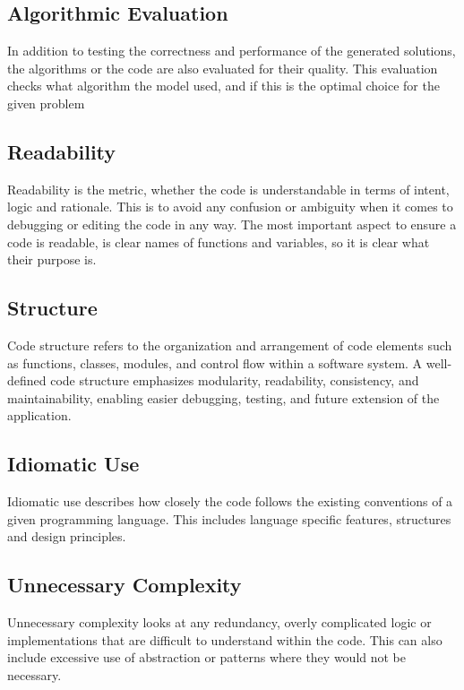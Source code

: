 \documentclass[12pt,a4paper]{report}
\begin{document}
\subsection{Algorithmic Evaluation}
In addition to testing the correctness and performance of the generated solutions, the algorithms or the code are also evaluated for their quality. This evaluation checks what algorithm the model used, and if this is the optimal choice for the given problem 

\subsection{Readability}
Readability is the metric, whether the code is understandable in terms of intent, logic and rationale. This is to avoid any confusion or ambiguity when it comes to debugging or editing the code in any way. The most important aspect to ensure a code is readable, is clear names of functions and variables, so it is clear what their purpose is.

\subsection{Structure}
Code structure refers to the organization and arrangement of code elements such as functions, classes, modules, and control flow within a software system. A well-defined code structure emphasizes modularity, readability, consistency, and maintainability, enabling easier debugging, testing, and future extension of the application.

\subsection{Idiomatic Use}
Idiomatic use describes how closely the code follows the existing conventions of a given programming language. This includes language specific features, structures and design principles.

\subsection{Unnecessary Complexity}
Unnecessary complexity looks at any redundancy, overly complicated logic or implementations that are difficult to understand within the code. This can also include excessive use of abstraction or patterns where they would not be necessary.
\end{document}
